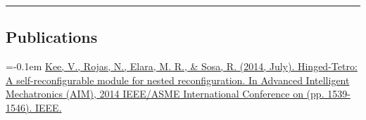 \documentclass[10pt,letterpaper]{article}
\begin{document}
\hrule
\vspace{-0.6em}

\subsection*{Publications}
    \parskip=-0.1em
{\href{http://ieeexplore.ieee.org/xpls/abs_all.jsp?arnumber=6878302}{Kee, V., Rojas, N., Elara, M. R., \& Sosa, R. (2014, July). Hinged-Tetro: A self-reconfigurable module for nested reconfiguration. In Advanced Intelligent Mechatronics (AIM), 2014 IEEE/ASME International Conference on (pp. 1539-1546). IEEE.}}
\end{document}
